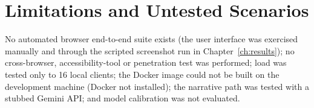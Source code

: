 \section{Limitations and Untested Scenarios}
No automated browser end-to-end suite exists (the user interface was exercised manually and through the
scripted screenshot run in Chapter~\ref{ch:results}); no cross-browser, accessibility-tool or penetration
test was performed; load was tested only to 16 local clients; the Docker image could not be built on the
development machine (Docker not installed); the narrative path was tested with a stubbed Gemini API; and
model calibration was not evaluated.
